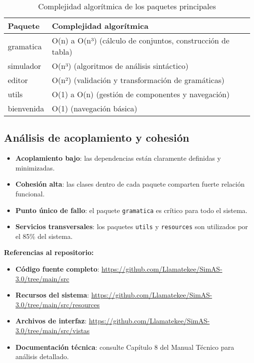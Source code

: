\begin{table}[H]
\centering
\caption{Complejidad algorítmica de los paquetes principales}
\label{tab:complejidad-paquetes}
\begin{tabular}{|l|l|}
\hline
\textbf{Paquete} & \textbf{Complejidad algorítmica} \\
\hline
gramatica & O(n) a O(n³) (cálculo de conjuntos, construcción de tabla) \\
simulador & O(n³) (algoritmos de análisis sintáctico) \\
editor & O(n²) (validación y transformación de gramáticas) \\
utils & O(1) a O(n) (gestión de componentes y navegación) \\
bienvenida & O(1) (navegación básica) \\
\hline
\end{tabular}
\end{table}

\subsection{Análisis de acoplamiento y cohesión}

\begin{itemize}
    \item \textbf{Acoplamiento bajo}: las dependencias están claramente definidas y minimizadas.
    \item \textbf{Cohesión alta}: las clases dentro de cada paquete comparten fuerte relación funcional.
    \item \textbf{Punto único de fallo}: el paquete \texttt{gramatica} es crítico para todo el sistema.
    \item \textbf{Servicios transversales}: los paquetes \texttt{utils} y \texttt{resources} son utilizados por el 85\% del sistema.
\end{itemize}

\textbf{Referencias al repositorio:}

\begin{itemize}
    \item \textbf{Código fuente completo}: \url{https://github.com/Llamatekee/SimAS-3.0/tree/main/src}
    \item \textbf{Recursos del sistema}: \url{https://github.com/Llamatekee/SimAS-3.0/tree/main/src/resources}
    \item \textbf{Archivos de interfaz}: \url{https://github.com/Llamatekee/SimAS-3.0/tree/main/src/vistas}
    \item \textbf{Documentación técnica}: consulte Capítulo 8 del Manual Técnico para análisis detallado.
\end{itemize}
